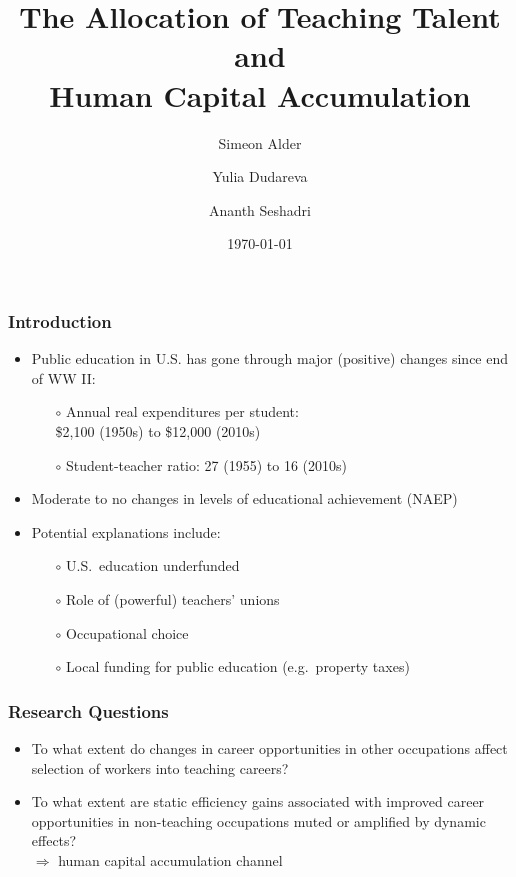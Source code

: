\documentclass[11pt]{beamer}
\title{The Allocation of Teaching Talent and \\Human Capital Accumulation}
\author[shortname]{Simeon Alder\inst{1} \and Yulia Dudareva\inst{2} \and Ananth Seshadri\inst{1}}
\institute[shortinst]{\inst{1} University of Wisconsin--Madison \and \inst{2} University of Stavanger Business School}
\date{\today}
\begin{document}
	
	\begin{frame}
		\titlepage
	\end{frame}
	
	\begin{frame}
		\frametitle{Introduction}
		\vfill
		\begin{itemize}
			\item Public education in U.S. has gone through major (positive) changes since end of WW II:
			\begin{itemize}
				\item[$\circ$] Annual real expenditures per student: \\
				\$2,100 (1950s) to \$12,000 (2010s)
				\item[$\circ$] Student-teacher ratio: 27 (1955) to 16 (2010s)
			\end{itemize}
			\vfill
			\item Moderate to no changes in levels of educational
                achievement (NAEP) 
			\vfill
			\item Potential explanations include:
			\begin{itemize}
				\item[$\circ$] U.S.~education underfunded %
				\item[$\circ$] Role of (powerful) teachers' unions \pause
				\item[$\circ$] \alert{Occupational choice} \pause
				\item[$\circ$] Local funding for public education (e.g.~property taxes)
			\end{itemize}
		\end{itemize}
		\vfill
	\end{frame}
	
	\begin{frame}
		\frametitle{Research Questions}
		\vfill
		\begin{itemize}
			\item To what extent do changes in career opportunities in other occupations affect selection of workers into teaching careers?
			\vfill
			\item To what extent are static efficiency gains associated with improved career opportunities in non-teaching occupations muted or amplified by dynamic effects?\\
			$\Rightarrow$ human capital accumulation channel
		\end{itemize}
		\vfill
	\end{frame}
	
\end{document}
